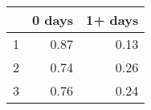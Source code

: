 \begin{table}[ht]
\centering
\begin{tabular}{rrr}
  \hline
 & 0 days & 1+ days \\ 
  \hline
1 & 0.87 & 0.13 \\ 
  2 & 0.74 & 0.26 \\ 
  3 & 0.76 & 0.24 \\ 
   \hline
\end{tabular}
\end{table}
